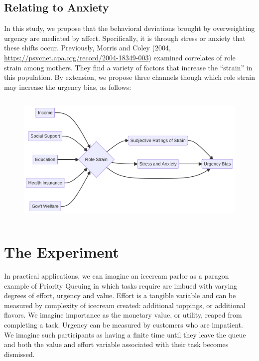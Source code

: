 \hypertarget{relating-to-anxiety}{%
\subsection{Relating to Anxiety}\label{relating-to-anxiety}}

In this study, we propose that the behavioral deviations brought by
overweighting urgency are mediated by affect. Specifically, it is
through stress or anxiety that these shifts occur. Previously, Morris
and Coley (2004, \url{https://psycnet.apa.org/record/2004-18349-003})
examined correlates of role strain among mothers. They find a variety of
factors that increase the ``strain'' in this population. By extension,
we propose three channels though which role strain may increase the
urgency bias, as follows:

\begin{figure}[H]

{\centering \includegraphics[width=5in,height=2.53in]{thesis-file-ppq_files/figure-latex/mermaid-figure-1.png}

}

\end{figure}

\hypertarget{the-experiment}{%
\section{The Experiment}\label{the-experiment}}

In practical applications, we can imagine an icecream parlor as a
paragon example of Priority Queuing in which tasks require are imbued
with varying degrees of effort, urgency and value. Effort is a tangible
variable and can be measured by complexity of icecream created:
additional toppings, or additional flavors. We imagine importance as the
monetary value, or utility, reaped from completing a task. Urgency can
be measured by customers who are impatient. We imagine such participants
as having a finite time until they leave the queue and both the value
and effort variable associated with their task becomes dismissed.

